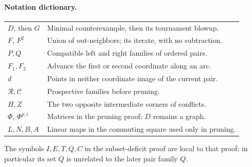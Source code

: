 \paragraph{Notation dictionary.}
\begin{center}
\begin{tabular}{p{2.5cm}p{9cm}}
$D$, then $G$ & Minimal counterexample, then its tournament blowup.\\
$F$, $F^2$ & Union of out-neighbors; its iterate, with no subtraction.\\
$P,Q$ & Compatible left and right families of ordered pairs.\\
$F_1,F_2$ & Advance the first or second coordinate along an arc.\\
$d$ & Points in neither coordinate image of the current pair.\\
$\mathcal R,\mathcal C$ & Prospective families before pruning.\\
$H,Z$ & The two opposite intermediate corners of conflicts.\\
$\Phi$, $\Phi^{p,i}$ & Matrices in the pruning proof; $D$ remains a graph.\\
$L,N,B,A$ & Linear maps in the commuting square used only in pruning.
\end{tabular}
\end{center}
The symbols $I,E,T,Q,C$ in the subset-deficit proof are local to that proof;
in particular its set $Q$ is unrelated to the later pair family $Q$.
